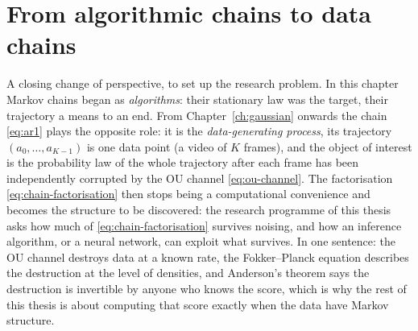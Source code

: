 \section{From algorithmic chains to data chains}

A closing change of perspective, to set up the research problem. In this
chapter Markov chains began as \emph{algorithms}: their stationary law
was the target, their trajectory a means to an end. From
Chapter~\ref{ch:gaussian} onwards the chain \eqref{eq:ar1} plays the
opposite role: it is the \emph{data-generating process}, its trajectory
$(a_0, \dots, a_{K-1})$ is one data point (a video of $K$ frames), and
the object of interest is the probability law of the whole trajectory
after each frame has been independently corrupted by the OU channel
\eqref{eq:ou-channel}. The factorisation \eqref{eq:chain-factorisation}
then stops being a computational convenience and becomes the structure to
be discovered: the research programme of this thesis asks how much of
\eqref{eq:chain-factorisation} survives noising, and how an inference
algorithm, or a neural network, can exploit what survives. In one
sentence: the OU channel destroys data at a known rate, the
Fokker--Planck equation describes the destruction at the level of
densities, and Anderson's theorem says the destruction is invertible by
anyone who knows the score, which is why the rest of this thesis is about
computing that score exactly when the data have Markov structure.
